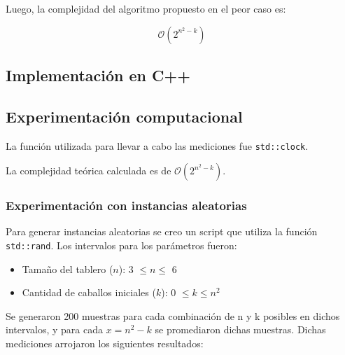 Luego, la complejidad del algoritmo propuesto en el peor caso es:


$$\mathcal{O}(2^{n^2 - k})$$

\newpage
\subsection{Implementación en C++}


\newpage
\subsection{Experimentación computacional}

La función utilizada para llevar a cabo las mediciones fue \texttt{std::clock}.

La complejidad teórica calculada es de $\mathcal{O}(2^{n^2 - k})$.

\subsubsection{Experimentación con instancias aleatorias}
Para generar instancias aleatorias se creo un script que utiliza la función \texttt{std::rand}. Los intervalos para los parámetros fueron:
\begin{itemize}
	\item Tamaño del tablero ($n$): 3 $\leq n \leq$ 6
   	\item Cantidad de caballos iniciales ($k$): 0 $\leq k \leq n^2$
\end{itemize}

Se generaron 200 muestras para cada combinación de n y k posibles en dichos intervalos, y para cada $x=n^2-k$ se promediaron dichas muestras.
Dichas mediciones arrojaron los siguientes resultados:

